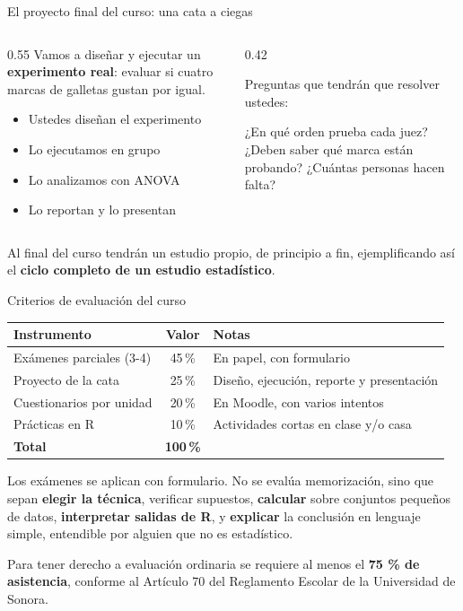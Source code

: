 \documentclass[aspectratio=169,10pt]{beamer}
\newcommand{\destaca}[1]{%
  \par\vspace{3pt}\noindent
  \colorbox{azulClaro}{%
    \parbox{\dimexpr\linewidth-2\fboxsep\relax}{\vspace{3pt}#1\vspace{3pt}}}%
  \par\vspace{3pt}}
\begin{document}
\begin{frame}{El proyecto final del curso: una cata a ciegas}
  \begin{columns}[T]
    \begin{column}{0.55\textwidth}
      Vamos a diseñar y ejecutar un \textbf{experimento real}: evaluar si cuatro
      marcas de galletas gustan por igual.
      \vspace{0.3cm}
      \begin{itemize}
        \item Ustedes diseñan el experimento
        \item Lo ejecutamos en grupo
        \item Lo analizamos con ANOVA
        \item Lo reportan y lo presentan
      \end{itemize}
    \end{column}
    \begin{column}{0.42\textwidth}
      \destaca{\small Preguntas que tendrán que resolver ustedes:
      \vspace{0.2cm}

      ¿En qué orden prueba cada juez? ¿Deben saber qué marca están probando? ¿Cuántas personas hacen falta?}
    \end{column}
  \end{columns}
  \vspace{0.4cm}
   \destaca{Al final del curso tendrán un estudio propio, de principio a fin, ejemplificando así el \textbf{ciclo completo de un estudio estadístico}.}
\end{frame}
\begin{frame}{Criterios de evaluación del curso}

  \centering
  {\small
  \begin{tabular}{@{}p{5.4cm}c p{5.9cm}@{}}
    \toprule
    \textbf{Instrumento} & \textbf{Valor} & \textbf{Notas} \\
    \midrule
    Exámenes parciales (3-4) & 45\,\% & En papel, con formulario \\
    Proyecto de la cata & 25\,\% & Diseño, ejecución, reporte y presentación \\
    Cuestionarios por unidad & 20\,\% & En Moodle, con varios intentos \\
    Prácticas en R & 10\,\% & Actividades cortas en clase y/o casa \\
    \midrule
    \textbf{Total} & \textbf{100\,\%} & \\
    \bottomrule
  \end{tabular}}
  \vspace{0.5cm}
  \raggedright
  \destaca{Los exámenes se aplican con formulario. No se evalúa memorización, sino que sepan \textbf{elegir la técnica}, verificar supuestos, \textbf{calcular} sobre conjuntos pequeños de datos, \textbf{interpretar salidas de R}, y \textbf{explicar} la conclusión en lenguaje simple, entendible por alguien que no es estadístico.}
\vspace{0.3cm}
  {\footnotesize Para tener derecho a evaluación ordinaria se requiere al menos el \textbf{75 \% de asistencia}, conforme al Artículo 70 del Reglamento Escolar de la Universidad de Sonora.}
\end{frame}
\end{document}

